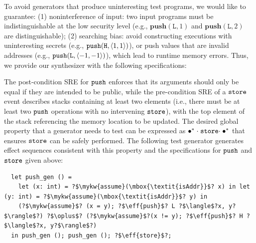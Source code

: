 To avoid generators that produce uninteresting test programs, we would like to guarantee: (1) noninterference of input: two input programs must be indistinguishable at the low security level (e.g., $\textbf{push}(\texttt{L}, 1)$ and $\textbf{push}(\texttt{L}, 2)$ are distinguishable); (2) searching bias: avoid constructing executions with uninteresting secrets (e.g., $\boldsymbol{{\tt push}}({{\tt H}, \langle 1, 1\rangle})$), or push values that are invalid addresses (e.g., $\boldsymbol{{\tt push}}({{\tt L},\langle -1, -1\rangle})$), which lead to runtime memory errors. Thus, we provide our synthesizer with the following \tyName{} specifications:
%
\vspace{-.4cm} \par{}\vspace{-.5cm} \par\nobreak\noindent
The post-condition SRE for $\boldsymbol{{\tt push}}$ enforces that its arguments
should only be equal if they are intended to be public, while the
pre-condition SRE of a $\boldsymbol{{\tt store}}$ event describes stacks
containing at least two elements (i.e., there must be at least two
$\boldsymbol{{\tt push}}$ operations with no intervening $\boldsymbol{{\tt store}}$), with the
top element of the stack referencing the memory location to be
updated.
The desired global property that a generator needs to test can be expressed as ${\bullet^*}\;{\cdot}\;\boldsymbol{{\tt store}}{\cdot}\;{\bullet^*}$ that ensures $\boldsymbol{{\tt store}}$ can be safely performed.
The following test generator generates effect sequences consistent with
this property and the \tyName{} specifications for $\boldsymbol{{\tt push}}$ and $\boldsymbol{{\tt store}}$ given above:
\begin{verbatim}
  let push_gen () =
    let (x: int) = ?$\mykw{assume}(\mbox{\textit{isAddr}}$? x) in let (y: int) = ?$\mykw{assume}(\mbox{\textit{isAddr}}$? y) in
    (?$\mykw{assume}$? (x = y); ?$\eff{push}$? L ?$\langle$?x, y?$\rangle$?) ?$\oplus$? (?$\mykw{assume}$?(x != y); ?$\eff{push}$? H ?$\langle$?x, y?$\rangle$?)
  in push_gen (); push_gen (); ?$\eff{store}$?;
\end{verbatim}

